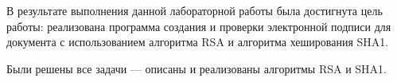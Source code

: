 \Conclusion %

В результате выполнения данной лабораторной работы была достигнута цель работы:  реализована программа создания и проверки электронной подписи для документа с использованием алгоритма RSA и алгоритма хеширования SHA1.

Были решены все задачи --- описаны и реализованы алгоритмы RSA и SHA1.
